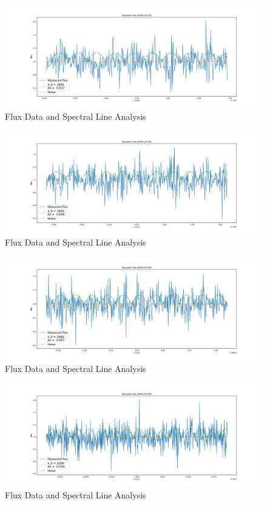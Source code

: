 \documentclass[reprint,english,notitlepage]{revtex4-2}
\begin{document}
    \begin{figure}[h!]
      \centering
      \includegraphics[scale =.3]{Figures/CO2 1400}
      \caption{Flux Data and Spectral Line Analysis}
      \label{fig: CO2 1400}
    \end{figure}

    \begin{figure}[h!]
      \centering
      \includegraphics[scale =.3]{Figures/CO2 1600}
      \caption{Flux Data and Spectral Line Analysis}
      \label{fig: CO2 1600}
    \end{figure}

    \begin{figure}[h!]
      \centering
      \includegraphics[scale =.3]{Figures/CH4 1660}
      \caption{Flux Data and Spectral Line Analysis}
      \label{fig: CH4 1660}
    \end{figure}

    \begin{figure}[h!]
      \centering
      \includegraphics[scale =.3]{Figures/CH4 2200}
      \caption{Flux Data and Spectral Line Analysis}
      \label{fig: CH4 2200}
    \end{figure}
\end{document}
